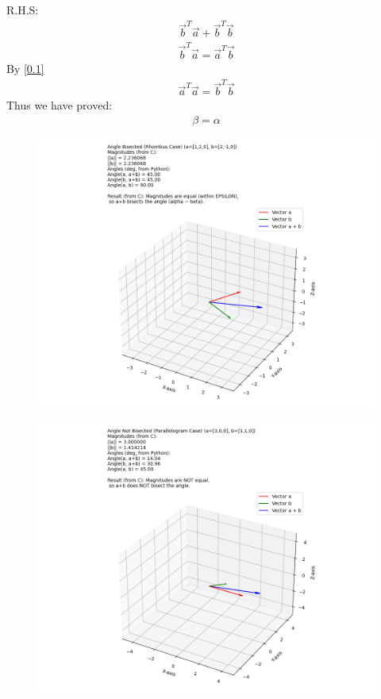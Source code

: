\documentclass[journal]{IEEEtran}
\begin{document}
	R.H.S:
	\begin{align}
		\vec{b}^T\vec{a} + \vec{b}^T\vec{b}
	\end{align}
	\begin{align}
		\vec{b}^T\vec{a} = \vec{a}^T\vec{b}
	\end{align}
	By \eqref{0.1}
	\begin{align}
		\vec{a}^T\vec{a} = \vec{b}^T\vec{b}
	\end{align}
	Thus we have proved:
	\begin{align}
		\beta = \alpha
	\end{align}		
		\begin{figure}[H]
		\centering
		\includegraphics[width = 0.8\columnwidth]{Figure_1.png}
		\caption*{}
		\label{fig1}
	\end{figure}
	\begin{figure}[H]
		\centering
		\includegraphics[width = 0.8\columnwidth]{Figure_2.png}
		\caption*{}
		\label{fig2}
	\end{figure}
	
	
\end{document}
